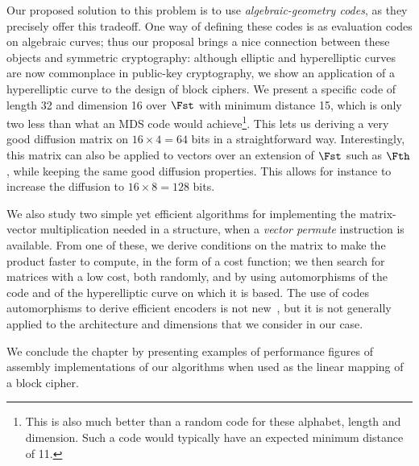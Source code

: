 Our proposed solution to this problem is to use \emph{algebraic-geometry codes}, as they precisely offer this tradeoff.
One way of defining these codes is as evaluation codes on algebraic curves; thus our proposal brings a nice connection between these objects and
symmetric cryptography: although elliptic and hyperelliptic curves are now commonplace in public-key cryptography, we show an application of
a hyperelliptic curve to the design of block ciphers. We present a specific code of length 32 and dimension 16 over $\Fst$ with minimum distance 15, which is only
two less than what an MDS code would achieve\footnote{This is also much better than a random code for these alphabet, length and dimension. Such a code
would typically have an expected minimum distance of 11.}.
This lets us deriving a very good diffusion matrix on $16\times4 = 64$ bits in a straightforward way. Interestingly, this matrix can also be applied
to vectors over an extension of $\Fst$ such as $\Fth$, while keeping the same good diffusion properties.
This allows for instance to increase the diffusion to $16\times8 = 128$ bits.

We also study two simple yet efficient algorithms for implementing the matrix-vector multiplication needed in a \shark{}
structure, when a \emph{vector permute} instruction is available. From one of these, we derive conditions on the matrix to make the product
faster to compute, in the form of a cost function; we then search for matrices with a low cost, both randomly, and by using automorphisms of the code and of the hyperelliptic
curve on which it is based. The use of codes automorphisms to derive efficient encoders is not new~\cite{sysgrob,grobarch},
but it is not generally applied to the architecture and dimensions that we consider in our case.

We conclude the chapter by presenting examples of performance figures of assembly implementations of our algorithms when used as the linear mapping of
a block cipher.
